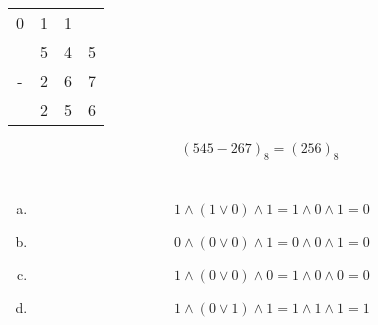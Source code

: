 \documentclass{article}
\begin{document}
\begin{center}
\begin{tabular}{cccc}
0&1&1\\
&5&4&5\\
-&2&6&7\\
\hline
&2&5&6
\end{tabular}
\end{center}
$$(545-267)_{8}=(256)_{8}$$

\section{}
\begin{enumerate}[(a)]
\item $$1 \land (1 \lor 0) \land 1 = 1 \land 0 \land 1 = 0$$
\item $$0 \land (0 \lor 0) \land 1 = 0 \land 0 \land 1 = 0$$
\item $$1 \land (0 \lor 0) \land 0 = 1 \land 0 \land 0 = 0$$
\item $$1 \land (0 \lor 1) \land 1 = 1 \land 1 \land 1 = 1$$
\end{enumerate}

\section{}
\end{document}
